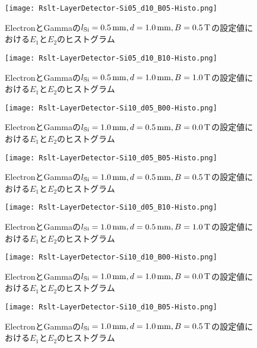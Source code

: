 \documentclass[a4paper,10pt]{jreport}
\begin{document}
\begin{figure}[H]
	\center
	\texttt{[image: Rslt-LayerDetector-Si05\_d10\_B05-Histo.png]}
	\caption{ElectronとGammaの$l_{\rm{Si}}=\SI{0.5}{mm}, d=\SI{1.0}{mm}, B=\SI{0.5}{T}$の設定値における$E_1$と$E_2$のヒストグラム}
	\label{Rslt-LayerDetector-Si05_d10_B05-Histo}
\end{figure}

\begin{figure}[H]
	\center
	\texttt{[image: Rslt-LayerDetector-Si05\_d10\_B10-Histo.png]}
	\caption{ElectronとGammaの$l_{\rm{Si}}=\SI{0.5}{mm}, d=\SI{1.0}{mm}, B=\SI{1.0}{T}$の設定値における$E_1$と$E_2$のヒストグラム}
	\label{Rslt-LayerDetector-Si05_d10_B10-Histo}
\end{figure}

\begin{figure}[H]
	\center
	\texttt{[image: Rslt-LayerDetector-Si10\_d05\_B00-Histo.png]}
	\caption{ElectronとGammaの$l_{\rm{Si}}=\SI{1.0}{mm}, d=\SI{0.5}{mm}, B=\SI{0.0}{T}$の設定値における$E_1$と$E_2$のヒストグラム}
	\label{Rslt-LayerDetector-Si10_d05_B00-Histo}
\end{figure}

\begin{figure}[H]
	\center
	\texttt{[image: Rslt-LayerDetector-Si10\_d05\_B05-Histo.png]}
	\caption{ElectronとGammaの$l_{\rm{Si}}=\SI{1.0}{mm}, d=\SI{0.5}{mm}, B=\SI{0.5}{T}$の設定値における$E_1$と$E_2$のヒストグラム}
	\label{Rslt-LayerDetector-Si10_d05_B05-Histo}
\end{figure}

\begin{figure}[H]
	\center
	\texttt{[image: Rslt-LayerDetector-Si10\_d05\_B10-Histo.png]}
	\caption{ElectronとGammaの$l_{\rm{Si}}=\SI{1.0}{mm}, d=\SI{0.5}{mm}, B=\SI{1.0}{T}$の設定値における$E_1$と$E_2$のヒストグラム}
	\label{Rslt-LayerDetector-Si10_d05_B10-Histo}
\end{figure}

\begin{figure}[H]
	\center
	\texttt{[image: Rslt-LayerDetector-Si10\_d10\_B00-Histo.png]}
	\caption{ElectronとGammaの$l_{\rm{Si}}=\SI{1.0}{mm}, d=\SI{1.0}{mm}, B=\SI{0.0}{T}$の設定値における$E_1$と$E_2$のヒストグラム}
	\label{Rslt-LayerDetector-Si10_d10_B00-Histo}
\end{figure}

\begin{figure}[H]
	\center
	\texttt{[image: Rslt-LayerDetector-Si10\_d10\_B05-Histo.png]}
	\caption{ElectronとGammaの$l_{\rm{Si}}=\SI{1.0}{mm}, d=\SI{1.0}{mm}, B=\SI{0.5}{T}$の設定値における$E_1$と$E_2$のヒストグラム}
	\label{Rslt-LayerDetector-Si10_d10_B05-Histo}
\end{figure}
\end{document}
